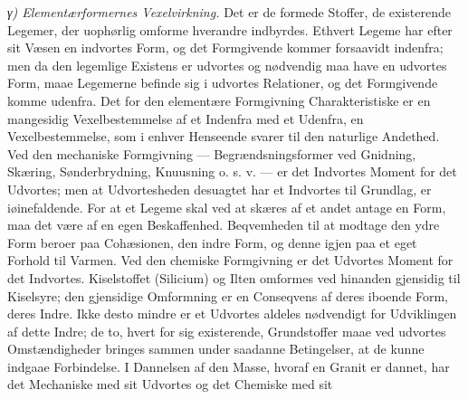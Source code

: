 \documentclass[12pt,a4paper]{book}
\newcommand{\subrunin}[1]{\emph{#1}\hspace{0.4em}}
\begin{document}
\subrunin{γ) Elementærformernes Vexelvirkning.} Det er de formede
Stoffer, de existerende Legemer, der uophørlig omforme hverandre
indbyrdes. Ethvert Legeme har efter sit Væsen en indvortes Form, og det
Formgivende kommer forsaavidt indenfra; men da den legemlige Existens er
udvortes og nødvendig maa have en udvortes Form, maae Legemerne befinde
sig i udvortes Relationer, og det Formgivende komme udenfra. Det for den
elementære Formgivning Charakteristiske er en mangesidig
Vexelbestemmelse af et Indenfra med et Udenfra, en Vexelbestemmelse, som
i enhver Henseende svarer til den naturlige Andethed. Ved den mechaniske
Formgivning --- Begrændsningsformer ved Gnidning, Skæring,
Sønderbrydning, Knuusning o. s. v. --- er det Indvortes Moment for det
Udvortes; men at Udvortesheden desuagtet har et Indvortes til Grundlag,
er iøinefaldende. For at et Legeme skal ved at skæres af et andet antage
en Form, maa det være af en egen Beskaffenhed. Beqvemheden til at
modtage den ydre Form beroer paa Cohæsionen, den indre Form, og denne
igjen paa et eget Forhold til Varmen. Ved den chemiske Formgivning er det
Udvortes Moment for det Indvortes. Kiselstoffet (Silicium) og Ilten
omformes ved hinanden gjensidig til Kiselsyre; den gjensidige Omformning
er en Conseqvens af deres iboende Form, deres Indre. Ikke desto mindre
er et Udvortes aldeles nødvendigt for Udviklingen af dette Indre; de to,
hvert for sig existerende, Grundstoffer maae ved udvortes
Omstændigheder bringes sammen under saadanne Betingelser, at de kunne
indgaae Forbindelse. I Dannelsen af den Masse, hvoraf en Granit er
dannet, har det Mechaniske med sit Udvortes og det Chemiske med sit
\end{document}
